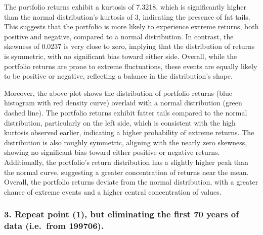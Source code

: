 \documentclass[
]{article}
\begin{document}
The portfolio returns exhibit a kurtosis of 7.3218, which is
significantly higher than the normal distribution's kurtosis of 3,
indicating the presence of fat tails. This suggests that the portfolio
is more likely to experience extreme returns, both positive and
negative, compared to a normal distribution. In contrast, the skewness
of 0.0237 is very close to zero, implying that the distribution of
returns is symmetric, with no significant bias toward either side.
Overall, while the portfolio returns are prone to extreme fluctuations,
these events are equally likely to be positive or negative, reflecting a
balance in the distribution's shape.

Moreover, the above plot shows the distribution of portfolio returns
(blue histogram with red density curve) overlaid with a normal
distribution (green dashed line). The portfolio returns exhibit fatter
tails compared to the normal distribution, particularly on the left
side, which is consistent with the high kurtosis observed earlier,
indicating a higher probability of extreme returns. The distribution is
also roughly symmetric, aligning with the nearly zero skewness, showing
no significant bias toward either positive or negative returns.
Additionally, the portfolio's return distribution has a slightly higher
peak than the normal curve, suggesting a greater concentration of
returns near the mean. Overall, the portfolio returns deviate from the
normal distribution, with a greater chance of extreme events and a
higher central concentration of values.

\hypertarget{repeat-point-1-but-eliminating-the-first-70-years-of-data-i.e.-from-199706.}{%
\subsubsection{3. Repeat point (1), but eliminating the first 70 years
of data (i.e.~from
199706).}\label{repeat-point-1-but-eliminating-the-first-70-years-of-data-i.e.-from-199706.}}
\end{document}
